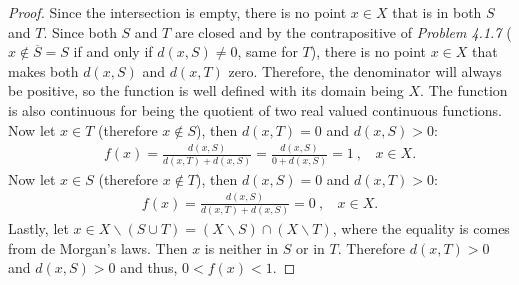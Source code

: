 \begin{questions}


\begin{solution}
  \begin{proof}
  Since the intersection is empty, there is no point $x\in X$ that is in both $S$ and $T$. Since both $S$ and $T$ are closed and by the contrapositive of \textit{Problem 4.1.7} ($x\not\in \overline{S}=S$ if and only if $d(x,S)\neq 0$, same for $T$), there is no point $x\in X$ that makes both $d(x,S)$ and $d(x,T)$ zero. Therefore, the denominator will always be positive, so the function is well defined with its domain being $X$. The function is also continuous for being the quotient of two real valued continuous functions.
Now let $x\in T$ (therefore $x\not\in S$), then $d(x,T)=0$ and $d(x,S)> 0$:
  \begin{align*}
  f(x)=\frac{d(x, S)}{d(x, T) + d(x, S)}=\frac{d(x, S)}{0 + d(x, S)}=1~,~~~~ x\in X.
  \end{align*}
Now let $x\in S$ (therefore $x\not\in T$), then $d(x,S)=0$ and $d(x,T)> 0$:
  \begin{align*}
  f(x)=\frac{d(x, S)}{d(x, T) + d(x, S)}=0~,~~~~ x\in X.
  \end{align*}
Lastly, let $x\in X\backslash (S\cup T)=(X\backslash S)\cap (X\backslash T)$, where the equality is comes from de Morgan's laws. Then $x$ is neither in $S$ or in $T$. Therefore $d(x,T)>0$ and $d(x,S)> 0$ and thus, $0<f(x)<1$.
  \end{proof}
\end{solution}
\end{questions}